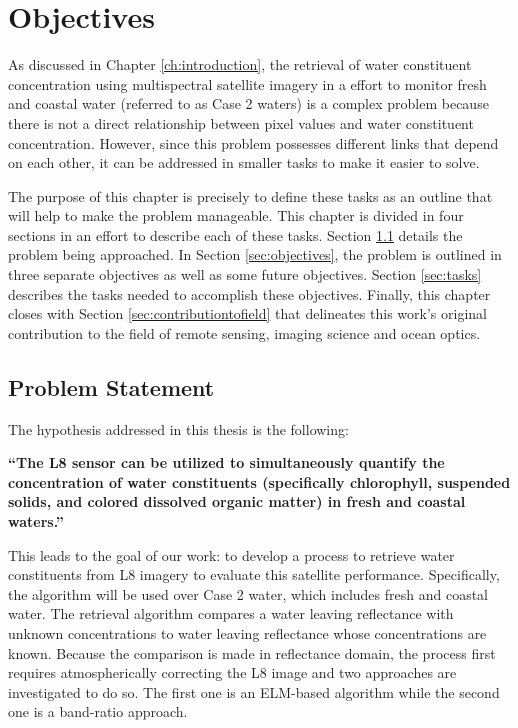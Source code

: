 \chapter{Objectives}
\label{ch:objectives}
As discussed in Chapter \ref{ch:introduction},  the retrieval of water constituent concentration using multispectral satellite imagery in a effort to monitor fresh and coastal water (referred to as Case 2 waters) is a complex problem because there is not a direct relationship between pixel values and water constituent concentration. However, since this problem possesses different links that depend on each other, it can be addressed in smaller tasks to make it easier to solve. 

The purpose of this chapter is precisely to define these tasks as an outline that will help to make the problem manageable. This chapter is divided in four sections in an effort to describe each of these tasks. Section \ref{sec:problemstatement} details the problem being approached. In Section \ref{sec:objectives}, the problem is outlined in {\color{red} three} separate objectives as well as some future objectives. Section \ref{sec:tasks} describes the tasks needed to accomplish these objectives. Finally, this chapter closes with Section \ref{sec:contributiontofield} that delineates this work's original contribution to the field of remote sensing, imaging science and ocean optics. 
\section{Problem Statement}
\label{sec:problemstatement}
The hypothesis addressed in this thesis is the following: 

{ \bf ``The L8 sensor can be utilized to simultaneously quantify the concentration of water constituents (specifically chlorophyll, { \color{red} suspended solids}, and colored dissolved organic matter) in fresh and coastal waters.''} 

This leads to the goal of our work: to develop a process to retrieve water constituents from L8 imagery to evaluate this satellite performance. Specifically, the algorithm will be used over Case 2 water, which includes fresh and coastal water. The retrieval algorithm compares a water leaving reflectance with unknown concentrations to water leaving reflectance whose concentrations are known. Because the comparison is made in reflectance domain, the process first requires atmospherically correcting the L8 image and two approaches are investigated to do so. The first one is an ELM-based algorithm while the second one is a { band-ratio approach}.


